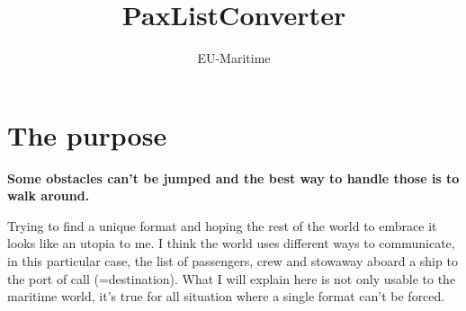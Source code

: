 \documentclass[a4paper, 11pt]{article}
\newcommand{\head}[1]{\textnormal{\textbf{#1}}}
\begin{document}
\title{PaxListConverter}
\author{EU-Maritime}
\maketitle



\section{The purpose}
\head{
Some obstacles can't be jumped and the best way to handle those is to walk around.
}

Trying to find a unique format and hoping the rest of the world to embrace it looks like an utopia to me. I think the world uses different ways to communicate, in this particular case, the list of passengers, crew and stowaway aboard a ship to the port of call (=destination). What I will explain here is not only usable to the maritime world, it's true for all situation where a single format can't be forced.
\end{document}
